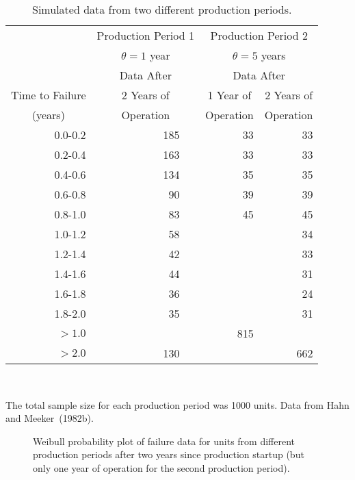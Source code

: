 \begin{table}
\caption{Simulated data from two different production periods.}
\centering\small
\begin{tabular}{r@{\hspace{2ex}}rr@{\hspace{2ex}}r@{\hspace{3ex}}rr}
\\[-.5ex]
\hline
& \multicolumn{3}{c}{Production Period 1}
& \multicolumn{2}{c}{Production Period 2}\\
 & \multicolumn{3}{c}{$\theta=1$ year}
& \multicolumn{2}{c}{$\theta=5$ years}  \\[.5ex]
&  \multicolumn{3}{c}{Data After} 
&\multicolumn{2}{c}{Data After} \\
\cline{5-6}
Time to Failure&  \multicolumn{3}{c}{2 Years of} & \multicolumn{1}{c}{1 Year of}
& \multicolumn{1}{c}{2 Years of}  \\
\multicolumn{1}{c}{(years)}&& \multicolumn{1}{c}{Operation} && \multicolumn{1}{c}{Operation}
& \multicolumn{1}{c}{Operation}  \\
\hline
   0.0-0.2    &&  185  &   & 33    & 33  \\
   0.2-0.4    &&  163  &   & 33    & 33  \\
   0.4-0.6    &&  134  &    & 35    & 35  \\
   0.6-0.8    &&  90   &   & 39    & 39  \\
   0.8-1.0    &&  83   &   & 45    & 45  \\
   1.0-1.2    &&  58   &   &     & 34  \\
   1.2-1.4    &&  42   &   &     & 33  \\
   1.4-1.6    &&  44   &   &     & 31  \\
   1.6-1.8    &&  36   &   &     & 24  \\
   1.8-2.0    &&  35   &   &     & 31  \\
  $> 1.0$     &&       &   & 815   &   \\
  $> 2.0$    &&   130  &   &       & 662  \\
\hline      
\end{tabular}\\
\begin{minipage}[t]{4in}
The total sample size for each production period was 1000 units.
Data from Hahn and Meeker~(1982b).
\end{minipage}
\label{table:sim.mix.data}
\end{table}

\begin{figure}
\caption{Weibull probability plot of failure data for units from
different production periods after two years since production startup
(but only one year of operation for the second production period).}
\label{figure:sim.mix1.ps}
\end{figure}

